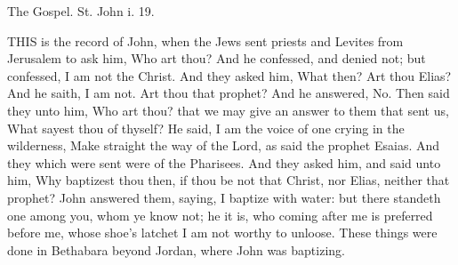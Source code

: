 The Gospel. St. John i. 19.

THIS is the record of John, when the Jews sent priests and Levites from Jerusalem to ask him, Who art thou? And he confessed, and denied not; but confessed, I am not the Christ. And they asked him, What then? Art thou Elias? And he saith, I am not. Art thou that prophet? And he answered, No. Then said they unto him, Who art thou? that we may give an answer to them that sent us, What sayest thou of thyself? He said, I am the voice of one crying in the wilderness, Make straight the way of the Lord, as said the prophet Esaias. And they which were sent were of the Pharisees. And they asked him, and said unto him, Why baptizest thou then, if thou be not that Christ, nor Elias, neither that prophet? John answered them, saying, I baptize with water: but there standeth one among you, whom ye know not; he it is, who coming after me is preferred before me, whose shoe's latchet I am not worthy to unloose. These things were done in Bethabara beyond Jordan, where John was baptizing.